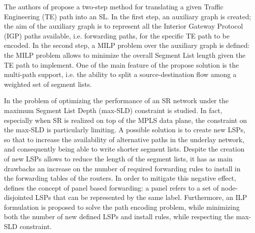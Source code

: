 The authors of \cite{translating} propose a two-step method for translating a given Traffic Engineering (TE) path into an SL. In the first step, an auxiliary graph is created; the aim of the auxiliary graph is to represent all the Interior Gateway Protocol (IGP) paths available, i.e. forwarding paths, for the specific TE path to be encoded. In the second step, a MILP problem over the auxiliary graph is defined: the MILP problem allows to minimize the overall Segment List length given the TE path to implement. One of the main feature of the propose solution is the multi-path support, i.e. the ability to split a source-destination flow among a weighted set of segment lists. 

In \cite{liaoruo2018optimizing} the problem of optimizing the performance of an SR network under the maximum Segment List Depth (max-SLD) constraint is studied.
In fact, especially when SR is realized on top of the MPLS data plane, the constraint on the max-SLD is particularly limiting.
A possible solution is to create new LSPs, so that to increase the availability of alternative paths in the underlay network, and consequently being able to write shorter segment lists.
Despite the creation of new LSPs allows to reduce the length of the segment lists, it has as main drawbacks an increase on the number of required forwarding rules to install in the forwarding tables of the routers.
In order to mitigate this negative effect, \cite{liaoruo2018optimizing} defines the concept of panel based forwarding: a panel refers to a set of node-disjointed LSPs that can be represented by the same label.
Furthermore, an ILP formulation is proposed to solve the path encoding problem, while minimizing both the number of new defined LSPs and install rules, while respecting the max-SLD constraint.

